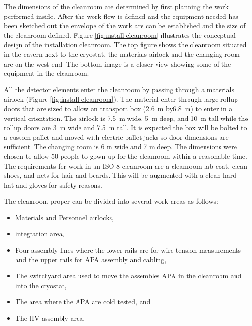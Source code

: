 The dimensions of the cleanroom are determined by first planning the work performed inside. After the work flow is defined and the equipment needed has been sketched out the envelope of the work are can be established and the size of the cleanroom defined. Figure \ref{fig:install-cleanroom} illustrates  the conceptual design of the installation cleanroom. The top figure shows the cleanroom situated in the cavern next to the cryostat, the materials airlock and the changing room are on the west end. The bottom image is a closer view showing some of the equipment in the cleanroom. 



All the detector elements enter the cleanroom by passing through a materials airlock (Figure \ref{fig:install-cleanroom}). 
The material enter through large rollup doors that are sized to allow an  transport box (\SI{2.6}{m} by\SI{6.8}{m}) to enter in a vertical orientation. 
The airlock is \SI{7.5}{m} wide, \SI{5}{m} deep, and \SI{10}{m} tall while the rollup doors are \SI{3}{m} wide and \SI{7.5}{m} tall. 
It is expected the  box will be bolted to a custom pallet and moved with electric pallet jacks so door dimensions are sufficient. 
The changing room is 6 \si{m} wide and 7 \si{m} deep. 
The dimensions were chosen to allow 50 people to gown up for the cleanroom within a reasonable time. 
The requirements for work in an ISO-8 cleanroom are a cleanroom lab coat, clean shoes, and nets for hair and beards.  
This will be augmented with a clean hard hat and gloves for safety reasons. 


The cleanroom proper can be divided into several work areas as follows:
\begin{itemize}
\setlength\itemsep{1mm}
\setlength{\parsep}{1mm}
\setlength{\itemsep}{-5mm}
    \item Materials and Personnel airlocks,
    \item {} integration area,
    \item Four  assembly lines where the lower rails are for wire tension measurements and the upper rails for APA  assembly and cabling,
    \item The switchyard area used to move the assembles APA in the cleanroom and into the cryostat,
    \item The \coldbox area where the APA are cold tested, and
    \item The HV assembly area.
\end{itemize}

